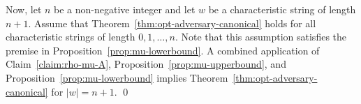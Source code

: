 Now, let $n$ be a non-negative integer and 
let $w$ be a characteristic string of length $n+1$. 
Assume that Theorem~\ref{thm:opt-adversary-canonical} 
holds for all characteristic strings of length $0, 1, \ldots, n$. 
Note that this assumption satisfies 
the premise in Proposition~\ref{prop:mu-lowerbound}. 
A combined application of 
Claim~\ref{claim:rho-mu-A}, Proposition~\ref{prop:mu-upperbound}, 
and Proposition~\ref{prop:mu-lowerbound} 
implies 
Theorem~\ref{thm:opt-adversary-canonical} 
for $|w| = n + 1$.
\hfill\qed









